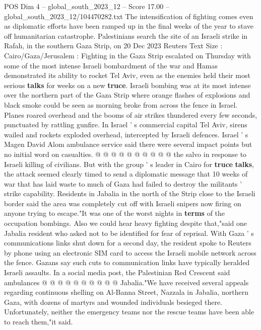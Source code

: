 \begin{textsample}{POS Dim 4 – global\_south\_2023\_12 – Score 17.00 – global\_south\_2023\_12/104470282.txt}  \label{ex:f4_pos_140}
The intensification of fighting comes even as diplomatic efforts have been ramped up in the final weeks of the year to stave off humanitarian catastrophe.
Palestinians search the site of an Israeli strike in Rafah, in the southern Gaza Strip, on 20 Dec 2023 Reuters Text Size : Cairo/Gaza/Jerusalem : Fighting in the Gaza Strip escalated on Thursday with some of the most intense Israeli bombardment of the war and Hamas demonstrated its ability to rocket Tel Aviv, even as the enemies held their most serious \textbf{talks} for weeks on a new \textbf{truce}.
Israeli bombing was at its most intense over the northern part of the Gaza Strip where orange flashes of explosions and black smoke could be seen as morning broke from across the fence in Israel.
Planes roared overhead and the booms of air strikes thundered every few seconds, punctuated by rattling gunfire.
In Israel ' s commercial capital Tel Aviv, sirens wailed and rockets exploded overhead, intercepted by Israeli defences.
Israel ' s Magen David Alom ambulance service said there were several impact points but no initial word on casualties. @ @ @ @ @ @ @ @ @ @ the salvo in response to Israeli killing of civilians.
But with the group ' s leader in Cairo for \textbf{truce} \textbf{talks}, the attack seemed clearly timed to send a diplomatic message that 10 weeks of war that has laid waste to much of Gaza had failed to destroy the militants ' strike capability.
Residents in Jabalia in the north of the Strip close to the Israeli border said the area was completely cut off with Israeli snipers now firing on anyone trying to escape."It was one of the worst nights in \textbf{terms} of the occupation bombings.
Also we could hear heavy fighting despite that,"said one Jabalia resident who asked not to be identified for fear of reprisal.
With Gaza ' s communications links shut down for a second day, the resident spoke to Reuters by phone using an electronic SIM card to access the Israeli mobile network across the fence.
Gazans say such cuts to communication links have typically heralded Israeli assaults.
In a social media post, the Palestinian Red Crescent said ambulances @ @ @ @ @ @ @ @ @ @ Jabalia."We have received several appeals regarding continuous shelling on Al-Banna Street, Nazzala in Jabalia, northern Gaza, with dozens of martyrs and wounded individuals besieged there.
Unfortunately, neither the emergency teams nor the rescue teams have been able to reach them,"it said.

\end{textsample}
